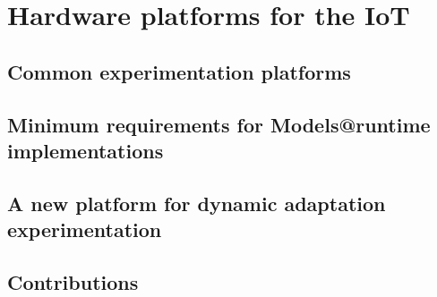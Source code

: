 \chapter{Hardware platforms for the IoT}
\label{sec:DiverseBoard}

\section{Common experimentation platforms}

\section{Minimum requirements for Models@runtime implementations}

\section{A new platform for dynamic adaptation experimentation}

\section{Contributions}